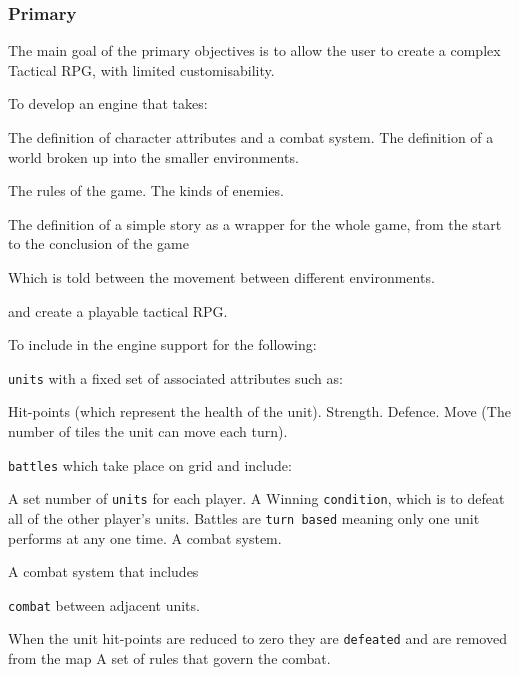 \subsubsection{Primary}
\label{primary}
The main goal of the primary objectives is to allow the user to create a complex Tactical RPG, with limited customisability.  
\begin{itemize}
\tick To develop an engine that takes:
\begin{itemize}

 	\tick The definition of character attributes and a combat system.
	\tick The definition of a world broken up into the smaller environments.
	\begin{itemize}
		\tick The rules of the game.
		\tick The kinds of enemies.
	\end{itemize}
	
	\tick The definition of a simple story as a wrapper for the whole game, from the start to the conclusion of the game
	\begin{itemize}
		\tick Which is told between the movement between different environments.
	\end{itemize}
	                        
\end{itemize}
and create a playable tactical RPG.

\tick To include in the engine support for the following:

\begin{itemize}
	\tick \texttt{units} with a fixed set of associated attributes such as:
	\begin{itemize}
		\tick Hit-points (which represent the health of the unit).
		\tick Strength.
		\tick Defence.
		\tick Move (The number of tiles the unit can move each turn).
	\end{itemize}
	
	\tick \texttt{battles} which take place on grid and include:
	\begin{itemize}
		\tick  A set number of \texttt{units} for each player.
		\tick  A Winning \texttt{condition}, which is to defeat all of the other player's units.
		\tick  Battles are \texttt{turn based} meaning only one unit performs at any one time.   
		\tick  A combat system.
	\end{itemize}
	
	\tick A combat system that includes
		\begin{itemize}
			\tick \texttt{combat} between adjacent units.
			\begin{itemize}
				\tick When the unit hit-points are reduced to zero they are \texttt{defeated} and are removed from the map
			\tick A set of rules that govern the combat.
			\end{itemize}
			

\end{itemize}
\end{itemize}
\end{itemize}
